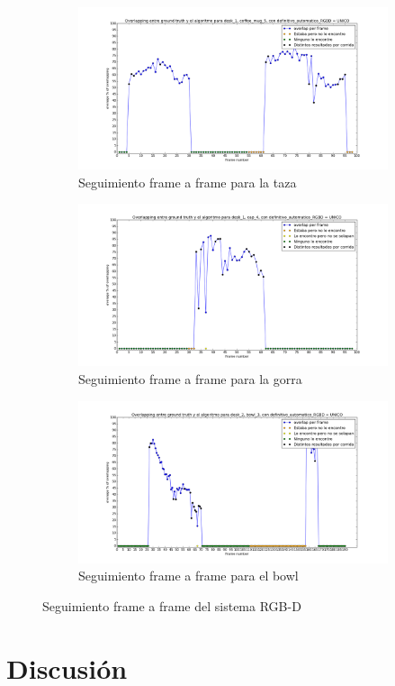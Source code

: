 \begin{figure}
	\centering
	\begin{subfigure}[b]{\textwidth}
		\includegraphics[width=\textwidth]{img/seguimientoframeaframe-sistema-rgbd-taza.png}
		\caption{Seguimiento frame a frame para la taza}
		\label{frame_frame_sistema-rgb-d_taza}
	\end{subfigure}
	\quad
	\begin{subfigure}[b]{\textwidth}
		\includegraphics[width=\textwidth]{img/seguimientoframeaframe-sistema-rgbd-gorra.png}
		\caption{Seguimiento frame a frame para la gorra}
		\label{frame_frame_sistema-rgb-d_gorra}
	\end{subfigure}
	\quad
	\begin{subfigure}[b]{\textwidth}
		\includegraphics[width=\textwidth]{img/seguimientoframeaframe-sistema-rgbd-bowl.png}
		\caption{Seguimiento frame a frame para el bowl}
		\label{frame_frame_sistema-rgb-d_bowl}
	\end{subfigure}
	\caption{Seguimiento frame a frame del sistema RGB-D}
	\label{frame_frame_d}
\end{figure}







\section{Discusión}
